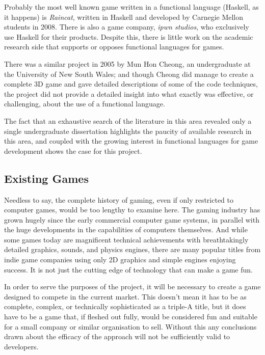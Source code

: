 Probably the most well known game written in a functional language (Haskell, as it happens) is \emph{Raincat}, written in Haskell and developed by Carnegie Mellon students in 2008. There is also a game company, \emph{ipwn studios}, who exclusively use Haskell for their products. Despite this, there is little work on the academic research side that supports or opposes functional languages for games. 

There was a similar project in 2005 by Mun Hon Cheong, an undergraduate at the University of New South Wales;\cite{cheong2005functional} and though Cheong did manage to create a complete 3D game and gave detailed descriptions of some of the code techniques, the project did not provide a detailed insight into what exactly was effective, or challenging, about the use of a functional language.

The fact that an exhaustive search of the literature in this area revealed only a single undergraduate dissertation highlights the paucity of available research in this area, and coupled with the growing interest in functional languages for game development shows the case for this project.

\subsection{Existing Games}

Needless to say, the complete history of gaming, even if only restricted to computer games, would be too lengthy to examine here. The gaming industry has grown hugely since the early commercial computer game systems, in parallel with the huge developments in the capabilities of computers themselves. And while some games today are magnificent technical achievements with breathtakingly detailed graphics, sounds, and physics engines, there are many popular titles from indie game companies using only 2D graphics and simple engines enjoying success. It is not just the cutting edge of technology that can make a game fun.

In order to serve the purposes of the project, it will be necessary to create a game designed to compete in the current market. This doesn't mean it has to be as complete, complex, or technically sophisticated as a triple-A title, but it does have to be a game that, if fleshed out fully, would be considered fun and suitable for a small company or similar organisation to sell. Without this any conclusions drawn about the efficacy of the approach will not be sufficiently valid to developers.


